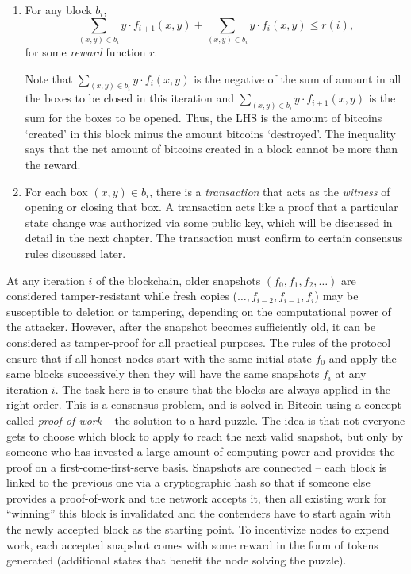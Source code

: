 \documentclass[]{report}   %
\begin{document}
\begin{enumerate}
	\item For any block $b_{i}$, $$\sum_{(x, y)\in b_{i}} y\cdot f_{i+1}(x, y) +\sum_{(x, y)\in b_{i}} y\cdot f_{i}(x, y) \leq  r(i),$$ for some {\em reward} function $r$.
	
	Note that $\sum_{(x, y)\in b_{i}} y\cdot f_{i}(x, y)$ is the negative of the sum of amount in all the boxes to be closed in this iteration and $\sum_{(x, y)\in b_{i}} y\cdot f_{i+1}(x, y)$ is the sum for the boxes to be opened. Thus, the LHS is the amount of bitcoins `created' in this block minus the amount bitcoins `destroyed'. The inequality says that the net amount of bitcoins created in a block cannot be more than the reward. 
	\item For each box $(x, y)\in b_i$, there is a {\em transaction} that acts as the {\em witness} of opening or	closing that box. A transaction acts like a proof that a particular state change was authorized via some public key, which will be discussed in detail in the next chapter. The transaction must confirm to certain consensus rules discussed later.
\end{enumerate}

At any iteration $i$ of the blockchain, older snapshots $(f_0, f_1, f_2, \ldots)$ are considered tamper-resistant while fresh copies ($\ldots, f_{i-2}, f_{i-1}, f_i$) may be susceptible to deletion or tampering, depending on the computational power of the attacker. However, after the snapshot becomes sufficiently old, it can be considered as tamper-proof for all practical purposes. The rules of the protocol ensure that if all honest nodes start with the same initial state $f_0$ and apply the same blocks successively then they will have the same snapshots $f_i$ at any iteration $i$. The task here is to ensure that the blocks are always applied in the right order. This is a consensus problem, and is solved in Bitcoin using a concept called {\em proof-of-work} -- the solution to a hard puzzle. The idea is that not everyone gets to choose which block to apply to reach the next valid snapshot, but only by someone who has invested a large amount of computing power and provides the proof on a first-come-first-serve basis. Snapshots are connected -- each block is linked to the previous one via a cryptographic hash so that if someone else provides a proof-of-work and the network accepts it, then all existing work for ``winning'' this block is invalidated and the contenders have to start again with the newly accepted block as the starting point. To incentivize nodes to expend work, each accepted snapshot comes with some reward in the form of tokens generated (additional states that benefit the node solving the puzzle). 
\end{document}
